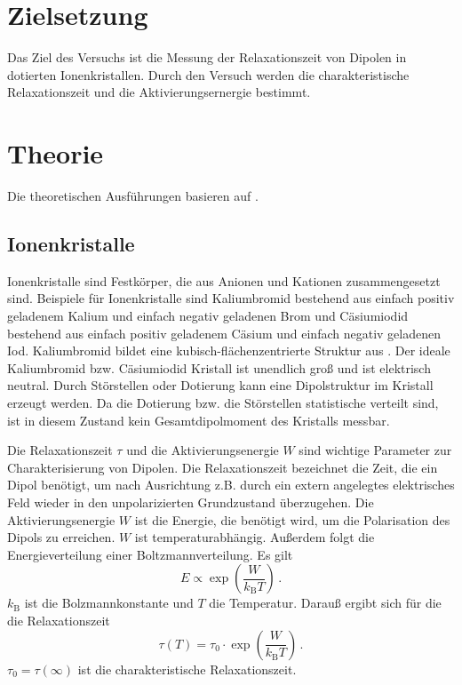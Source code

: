 \section{Zielsetzung}
\label{sec:Zielsetzung}
Das Ziel des Versuchs ist die Messung der Relaxationszeit von Dipolen in dotierten Ionenkristallen. Durch den Versuch werden die charakteristische Relaxationszeit und die Aktivierungsernergie bestimmt. 
\section{Theorie}
\label{sec:Theorie}
Die theoretischen Ausführungen basieren auf \cite{Fuller}. 
\subsection{Ionenkristalle} 
\label{Ionenkristalle} 
Ionenkristalle sind Festkörper, die aus Anionen und Kationen zusammengesetzt sind. Beispiele für Ionenkristalle sind Kaliumbromid bestehend aus einfach positiv geladenem Kalium und einfach negativ geladenen Brom und Cäsiumiodid bestehend aus einfach positiv geladenem Cäsium und einfach negativ geladenen Iod. Kaliumbromid bildet eine kubisch-flächenzentrierte Struktur aus \cite{NaCl_Struktur} \cite{fcc_Struktur}. Der ideale Kaliumbromid bzw. Cäsiumiodid Kristall ist unendlich groß und ist elektrisch neutral. Durch Störstellen oder Dotierung kann eine Dipolstruktur im Kristall erzeugt werden. Da die Dotierung bzw. die Störstellen statistische verteilt sind, ist in diesem Zustand kein Gesamtdipolmoment des Kristalls messbar. 

\label{Relaxationszeit und Aktivierungsenergie}
Die Relaxationszeit $\tau$ und die Aktivierungsenergie $W$ sind wichtige Parameter zur Charakterisierung von Dipolen. Die Relaxationszeit bezeichnet die Zeit, die ein Dipol benötigt, um nach Ausrichtung z.B. durch ein extern angelegtes elektrisches Feld wieder in den unpolarizierten Grundzustand überzugehen. Die Aktivierungsenergie $W$ ist die Energie, die benötigt wird, um die Polarisation des Dipols zu erreichen. $W$ ist temperaturabhängig. Außerdem folgt die Energieverteilung einer Boltzmannverteilung. Es gilt 
\begin{equation}
    E \propto \exp{\left( \frac{W}{k_\text{B} T}\right)} \, .
\end{equation}
$k_\text{B}$ ist die Bolzmannkonstante und $T$ die Temperatur. Darauß ergibt sich für die die Relaxationszeit 
\begin{equation}
    \tau(T) = \tau_0 \cdot \exp{\left( \frac{W}{k_\text{B} T}\right)} \, . \label{eqn:tau_exp}
\end{equation}
$\tau_0 = \tau(\infty)$ ist die charakteristische Relaxationszeit. 


